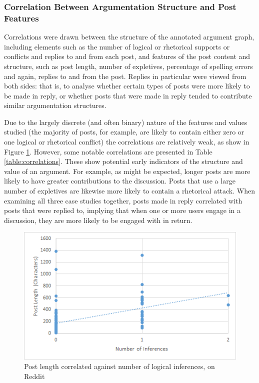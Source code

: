 \subsubsection{Correlation Between Argumentation Structure and Post Features}
Correlations were drawn between the structure of the annotated argument graph, including elements such as the number of logical or rhetorical supports or conflicts and replies to and from each post, and features of the post content and structure, such as post length, number of expletives, percentage of spelling errors and again, replies to and from the post. Replies in particular were viewed from both sides: that is, to analyse whether certain types of posts were more likely to be made in reply, or whether posts that were made in reply tended to contribute similar argumentation structures.

Due to the largely discrete (and often binary) nature of the features and values studied (the majority of posts, for example, are likely to contain either zero or one logical or rhetorical conflict) the correlations are relatively weak, as show in Figure \ref{figure:correlations:reddit}. However, some notable correlations are presented in Table \ref{table:correlations}. These show potential early indicators of the structure and value of an argument. For example, as might be expected, longer posts are more likely to have greater contributions to the discussion. Posts that use a large number of expletives are likewise more likely to contain a rhetorical attack. When examining all three case studies together, posts made in reply correlated with posts that were replied to, implying that when one or more users engage in a discussion, they are more likely to be engaged with in return.


\begin{figure}
\centering
\includegraphics[scale=0.5]{./figures/correlations/reddit.png}
\caption{Post length correlated against number of logical inferences, on Reddit}
\label{figure:correlations:reddit}
\end{figure}



